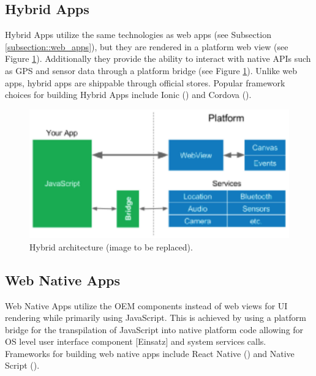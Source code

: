 \subsection{Hybrid Apps}
Hybrid Apps utilize the same technologies as web apps (see Subsection \ref{subsection::web_apps}), but they are rendered in a platform web view (see Figure \ref{fig:hybrid_architecture}). Additionally they provide the ability to 
interact with native APIs such as GPS and sensor data through a platform bridge (see Figure \ref{fig:hybrid_architecture}).
Unlike web apps, hybrid apps are shippable through official stores.
Popular framework choices for building Hybrid Apps include Ionic (\cite{Ionic2021}) and Cordova (\cite{Cordova2020}).

\begin{figure}
    \includegraphics[width=\linewidth]{images/architectures/hybrid_architecture.eps}
    \caption{Hybrid architecture (image to be replaced).}
    \label{fig:hybrid_architecture}
\end{figure}

\subsection{Web Native Apps} \label{subsection::web_native_apps}
Web Native Apps utilize the OEM components instead of web views for UI rendering while primarily using JavaScript.
This is achieved by using a platform bridge for the transpilation of JavaScript into native platform code allowing for OS level user interface component [Einsatz]
and system services calls. 
Frameworks for building web native apps include React Native (\cite{ReactNative2021}) and Native Script (\cite{NativeScript2021}).

